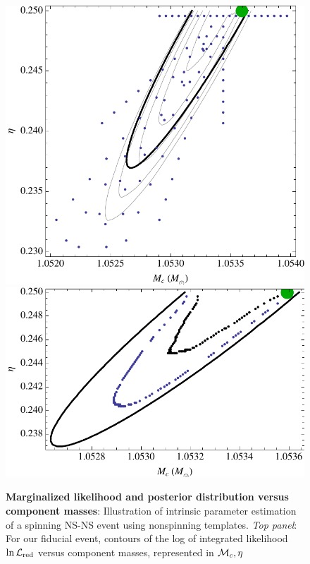 \begin{figure}
\includegraphics[width=\columnwidth]{../Figures/fig-mma-manual-coinc833-LReducedVersusMcEta}
\includegraphics[width=\columnwidth]{../Figures/fig-mma-manual-coinc833-PosteriorMcEta}
\caption{\label{fig:FiducialEvent:LikelihoodVersusMchirpEta}\textbf{Marginalized likelihood and posterior distribution
    versus component masses}: Illustration of intrinsic parameter estimation of a spinning NS-NS event using
    nonspinning templates.  \emph{Top panel}: 
For our fiducial event,
  contours of the log of integrated likelihood $\ln {\cal L}_{\rm red}$ versus component masses, represented in ${{\cal M}_c},\eta$
}
\end{figure}
